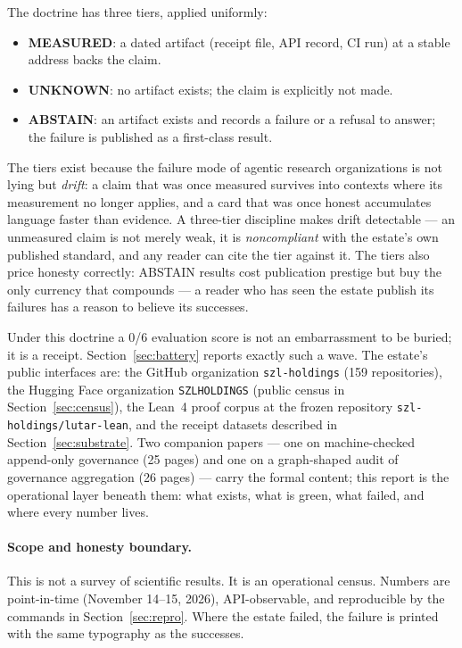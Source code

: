 \documentclass[11pt]{article}
\begin{document}
The doctrine has three tiers, applied uniformly:
\begin{itemize}
\item \textbf{MEASURED}: a dated artifact (receipt file, API record, CI run) at a stable address backs the claim.
\item \textbf{UNKNOWN}: no artifact exists; the claim is explicitly not made.
\item \textbf{ABSTAIN}: an artifact exists and records a failure or a refusal to answer; the failure is published as a first-class result.
\end{itemize}

The tiers exist because the failure mode of agentic research organizations is not lying but \emph{drift}: a claim that was once measured survives into contexts where its measurement no longer applies, and a card that was once honest accumulates language faster than evidence. A three-tier discipline makes drift detectable --- an unmeasured claim is not merely weak, it is \emph{noncompliant} with the estate's own published standard, and any reader can cite the tier against it. The tiers also price honesty correctly: ABSTAIN results cost publication prestige but buy the only currency that compounds --- a reader who has seen the estate publish its failures has a reason to believe its successes.

Under this doctrine a 0/6 evaluation score is not an embarrassment to be buried; it is a receipt. Section~\ref{sec:battery} reports exactly such a wave. The estate's public interfaces are: the GitHub organization \texttt{szl-holdings} (159 repositories), the Hugging Face organization \texttt{SZLHOLDINGS} (public census in Section~\ref{sec:census}), the Lean~4 proof corpus at the frozen repository \texttt{szl-holdings/lutar-lean}, and the receipt datasets described in Section~\ref{sec:substrate}. Two companion papers --- one on machine-checked append-only governance (25 pages) and one on a graph-shaped audit of governance aggregation (26 pages) --- carry the formal content; this report is the operational layer beneath them: what exists, what is green, what failed, and where every number lives.

\paragraph{Scope and honesty boundary.} This is not a survey of scientific results. It is an operational census. Numbers are point-in-time (November 14--15, 2026), API-observable, and reproducible by the commands in Section~\ref{sec:repro}. Where the estate failed, the failure is printed with the same typography as the successes.
\end{document}
